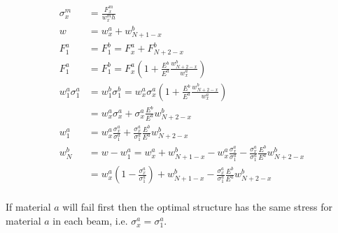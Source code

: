 \begin{align*}
    \sigma_x^m &= \frac{F_x^m}{w_x^m h}\\
    w &= w_x^a + w_{N+1-x}^b \\
    F_1^a &= F_1^b = F_x^a + F_{N+2-x}^b \\
    F_1^a &= F_1^b %
     = F_x^a \left( 1 + \frac{E^b}{E^a} \frac{w^b_{N+2-x}}{w^a_x} \right) \\
    w_1^a \sigma_1^a &= w_1^b \sigma_1^b = w_x^a \sigma_x^a \left( 1 + \frac{E^b}{E^a} \frac{w^b_{N+2-x}}{w^a_x} \right) \\
    &= w_x^a \sigma_x^a + \sigma_x^a \frac{E^b}{E^a} w^b_{N+2-x} \\
    w_1^a &= w_x^a \frac{\sigma_x^a}{\sigma_1^a} + \frac{\sigma_x^a}{\sigma_1^a} \frac{E^b}{E^a} w^b_{N+2-x} \\
    w_N^b &= w - w_1^a =  w_x^a + w_{N+1-x}^b  -  w_x^a \frac{\sigma_x^a}{\sigma_1^a} - \frac{\sigma_x^a}{\sigma_1^a} \frac{E^b}{E^a} w^b_{N+2-x} \\
    &= w_x^a \left( 1 - \frac{\sigma_x^a}{\sigma_1^a} \right) + w_{N+1-x}^b - \frac{\sigma_x^a}{\sigma_1^a} \frac{E^b}{E^a} w^b_{N+2-x} \\
\end{align*}

If material $a$ will fail first then the optimal structure has the same stress for material $a$ in each beam, i.e. $\sigma_x^a = \sigma_1^a$.

